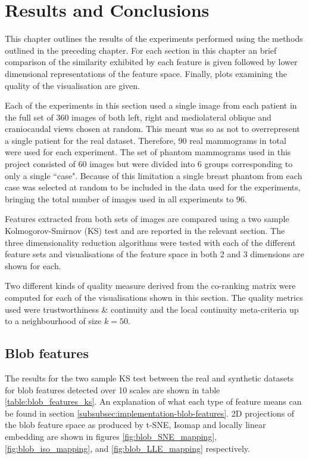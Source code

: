 \chapter{Results and Conclusions}
\label{chap:results}

This chapter outlines the results of the experiments performed using the methods outlined in the preceding chapter. For each section in this chapter an brief comparison of the similarity exhibited by each feature is given followed by lower dimensional representations of the feature space. Finally, plots examining the quality of the visualisation are given.

Each of the experiments in this section used a single image from each patient in the full set of 360 images of both left, right and mediolateral oblique and craniocaudal views chosen at random. This meant was so as not to overrepresent a single patient for the real dataset. Therefore, 90 real mammograms in total were used for each experiment. The set of phantom mammograms used in this project consisted of 60 images but were divided into 6 groups corresponding to only a single ``case". Because of this limitation a single breast phantom from each case was selected at random to be included in the data used for the experiments, bringing the total number of images used in all experiments to 96.

Features extracted from both sets of images are compared using a two sample Kolmogorov-Smirnov (KS) test and are reported in the relevant section. The three dimensionality reduction algorithms were tested with each of the different feature sets and visualisations of the feature space in both 2 and 3 dimensions are shown for each.

Two different kinds of quality measure derived from the co-ranking matrix were computed for each of the visualisations shown in this section. The quality metrics used were trustworthiness \& continuity and the local continuity meta-criteria up to a neighbourhood of size $k=50$.

\section{Blob features} 
The results for the two sample KS test between the real and synthetic datasets for blob features detected over 10 scales are shown in table \ref{table:blob_features_ks}. An explanation of what each type of feature means can be found in section \ref{subsubsec:implementation-blob-features}. 2D projections of the blob feature space as produced by t-SNE, Isomap and locally linear embedding are shown in figures \ref{fig:blob_SNE_mapping}, \ref{fig:blob_iso_mapping}, and \ref{fig:blob_LLE_mapping} respectively. 

